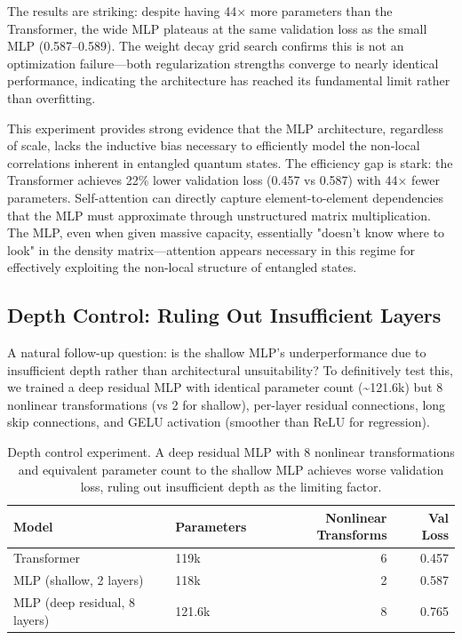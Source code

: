 \documentclass[11pt]{article}
\begin{document}
The results are striking: despite having 44× more parameters than the Transformer, the wide MLP plateaus at the same validation loss as the small MLP (0.587–0.589). The weight decay grid search confirms this is not an optimization failure—both regularization strengths converge to nearly identical performance, indicating the architecture has reached its fundamental limit rather than overfitting.

This experiment provides strong evidence that the MLP architecture, regardless of scale, lacks the inductive bias necessary to efficiently model the non-local correlations inherent in entangled quantum states. The efficiency gap is stark: the Transformer achieves 22\% lower validation loss (0.457 vs 0.587) with 44× fewer parameters. Self-attention can directly capture element-to-element dependencies that the MLP must approximate through unstructured matrix multiplication. The MLP, even when given massive capacity, essentially "doesn't know where to look" in the density matrix—attention appears necessary in this regime for effectively exploiting the non-local structure of entangled states.
\subsection{Depth Control: Ruling Out Insufficient Layers}
\label{sec:org1d3bdb4}

A natural follow-up question: is the shallow MLP's underperformance due to insufficient depth rather than architectural unsuitability? To definitively test this, we trained a deep residual MLP with identical parameter count (\textasciitilde{}121.6k) but 8 nonlinear transformations (vs 2 for shallow), per-layer residual connections, long skip connections, and GELU activation (smoother than ReLU for regression).

\begin{table}[htbp]
\caption{\label{tab:org063cce0}Depth control experiment. A deep residual MLP with 8 nonlinear transformations and equivalent parameter count to the shallow MLP achieves worse validation loss, ruling out insufficient depth as the limiting factor.}
\centering
\begin{tabular}{llrr}
Model & Parameters & Nonlinear Transforms & Val Loss\\
\hline
Transformer & 119k & 6 & 0.457\\
MLP (shallow, 2 layers) & 118k & 2 & 0.587\\
MLP (deep residual, 8 layers) & 121.6k & 8 & 0.765\\
\end{tabular}
\end{table}
\end{document}
